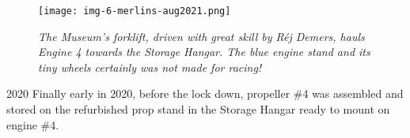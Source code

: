  \begin{figure}[H]
    \vspace{2em}
    \centering
    \texttt{[image: img-6-merlins-aug2021.png]}
    \caption*{\small \em The Museum’s forklift, driven with great skill by  R\'{e}j Demers, hauls Engine 4 towards the Storage Hangar.  The blue engine stand and its tiny wheels certainly was not made for racing!}
    \label{fig:img6}
 \end{figure}

2020 Finally early in 2020, before the lock down,  propeller \#4 was assembled
and stored on the refurbished prop stand in the Storage Hangar ready to mount on
engine \#4. 







 






